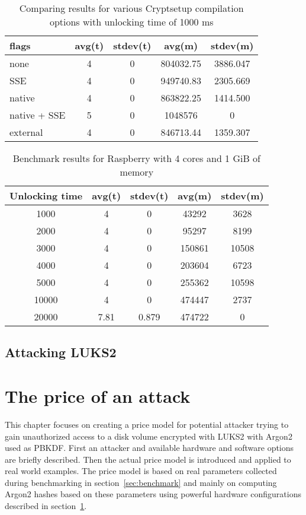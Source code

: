 \documentclass[nolof]{fithesis3}
\begin{document}
\noindent
\begin{table}
\caption{Comparing results for various Cryptsetup compilation options with unlocking time of 1000 ms}
\label{tab:comp1000}
\begin{tabularx}{\textwidth}{| l | c | c | c | c |}
\hline
flags & avg(t) & stdev(t) & avg(m) & stdev(m)\\
\hline
none & 4 & 0 & 804032.75 & 3886.047\\
\hline
SSE & 4 & 0 & 949740.83 & 2305.669\\
\hline
native & 4 & 0 & 863822.25 & 1414.500\\
\hline
native + SSE & 5 & 0 & 1048576 & 0\\
\hline
external & 4 & 0 & 846713.44 & 1359.307\\
\hline
\end{tabularx}
\end{table}

\noindent
\begin{table}
\caption{Benchmark results for Raspberry with 4 cores and 1 GiB of memory}
\label{tab:r4c1g}
\begin{tabularx}{\textwidth}{| c | c | c | c | c |}
\hline
Unlocking time & avg(t) & stdev(t) & avg(m) & stdev(m)\\
\hline
1000 & 4 & 0 & 43292 & 3628\\
\hline
2000 & 4 & 0 & 95297 & 8199\\
\hline
3000 & 4 & 0 & 150861 & 10508\\
\hline
4000 & 4 & 0 & 203604 & 6723\\
\hline
5000 & 4 & 0 & 255362 & 10598\\
\hline
10000 & 4 & 0 & 474447 & 2737\\
\hline
20000 & 7.81 & 0.879 & 474722 & 0\\
\hline
\end{tabularx}
\end{table}

\FloatBarrier

\section{Attacking LUKS2}
\label{sec:attack}


\chapter{The price of an attack}
\label{chap:model}
This chapter focuses on creating a price model for potential attacker trying to gain unauthorized access to a disk volume encrypted with LUKS2 with Argon2 used as PBKDF. First an attacker and available hardware and software options are briefly described. Then the actual price model is introduced and applied to real world examples. The price model is based on real parameters collected during benchmarking in section~\ref{sec:benchmark} and mainly on computing Argon2 hashes based on these parameters using powerful hardware configurations described in section~\ref{sec:attack}.
\end{document}
